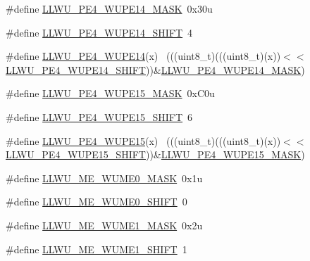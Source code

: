 \begin{DoxyCompactItemize}
\item 
\#define \hyperlink{group___l_l_w_u___register___masks_gae3a1e7b7497f719cfebd559f31dc4d07}{L\+L\+W\+U\+\_\+\+P\+E4\+\_\+\+W\+U\+P\+E14\+\_\+\+M\+A\+SK}~0x30u
\item 
\#define \hyperlink{group___l_l_w_u___register___masks_ga1942d07f99eb5afb836650dcfb2185af}{L\+L\+W\+U\+\_\+\+P\+E4\+\_\+\+W\+U\+P\+E14\+\_\+\+S\+H\+I\+FT}~4
\item 
\#define \hyperlink{group___l_l_w_u___register___masks_ga6d2ccf1ee3bb00a3c57a1ccb073b60b3}{L\+L\+W\+U\+\_\+\+P\+E4\+\_\+\+W\+U\+P\+E14}(x)                                          ~(((uint8\+\_\+t)(((uint8\+\_\+t)(x))$<$$<$\hyperlink{group___l_l_w_u___register___masks_ga1942d07f99eb5afb836650dcfb2185af}{L\+L\+W\+U\+\_\+\+P\+E4\+\_\+\+W\+U\+P\+E14\+\_\+\+S\+H\+I\+FT}))\&\hyperlink{group___l_l_w_u___register___masks_gae3a1e7b7497f719cfebd559f31dc4d07}{L\+L\+W\+U\+\_\+\+P\+E4\+\_\+\+W\+U\+P\+E14\+\_\+\+M\+A\+SK})
\item 
\#define \hyperlink{group___l_l_w_u___register___masks_ga53e48ffd153996ab89adb3c4df7511ee}{L\+L\+W\+U\+\_\+\+P\+E4\+\_\+\+W\+U\+P\+E15\+\_\+\+M\+A\+SK}~0x\+C0u
\item 
\#define \hyperlink{group___l_l_w_u___register___masks_gaeaf1e05b8de75133c46d6f11b3346732}{L\+L\+W\+U\+\_\+\+P\+E4\+\_\+\+W\+U\+P\+E15\+\_\+\+S\+H\+I\+FT}~6
\item 
\#define \hyperlink{group___l_l_w_u___register___masks_gaa8cf72eace0e0615ae08b40bbf46fa1b}{L\+L\+W\+U\+\_\+\+P\+E4\+\_\+\+W\+U\+P\+E15}(x)                                          ~(((uint8\+\_\+t)(((uint8\+\_\+t)(x))$<$$<$\hyperlink{group___l_l_w_u___register___masks_gaeaf1e05b8de75133c46d6f11b3346732}{L\+L\+W\+U\+\_\+\+P\+E4\+\_\+\+W\+U\+P\+E15\+\_\+\+S\+H\+I\+FT}))\&\hyperlink{group___l_l_w_u___register___masks_ga53e48ffd153996ab89adb3c4df7511ee}{L\+L\+W\+U\+\_\+\+P\+E4\+\_\+\+W\+U\+P\+E15\+\_\+\+M\+A\+SK})
\item 
\#define \hyperlink{group___l_l_w_u___register___masks_ga5f1588218d510ac13093055708ceae49}{L\+L\+W\+U\+\_\+\+M\+E\+\_\+\+W\+U\+M\+E0\+\_\+\+M\+A\+SK}~0x1u
\item 
\#define \hyperlink{group___l_l_w_u___register___masks_ga7f653f4ce89c4512437c0114f4659502}{L\+L\+W\+U\+\_\+\+M\+E\+\_\+\+W\+U\+M\+E0\+\_\+\+S\+H\+I\+FT}~0
\item 
\#define \hyperlink{group___l_l_w_u___register___masks_ga99b29643134140d21a3d4259b7f64c86}{L\+L\+W\+U\+\_\+\+M\+E\+\_\+\+W\+U\+M\+E1\+\_\+\+M\+A\+SK}~0x2u
\item 
\#define \hyperlink{group___l_l_w_u___register___masks_gac623d0db3076972370ee795830b555c1}{L\+L\+W\+U\+\_\+\+M\+E\+\_\+\+W\+U\+M\+E1\+\_\+\+S\+H\+I\+FT}~1

\end{DoxyCompactItemize}
